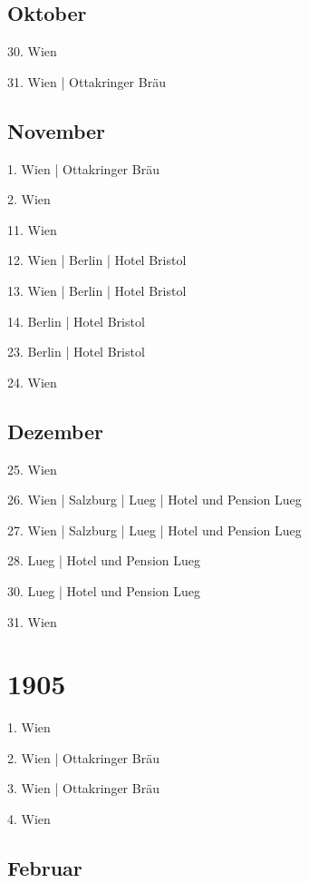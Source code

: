 \documentclass[twoside=false,titlepage=false,open=any, parskip=never, fontsize=10pt, headings=small, chapterprefix=false, appendixprefix=false, DIV=15]{scrbook}
\begin{document}
\begin{multicols}{3}
            \section*{Oktober}
            30. Wien\par
            31. Wien | Ottakringer Bräu\par
            \section*{November}
            1. Wien | Ottakringer Bräu\par
            2. Wien\par
            11. Wien\par
            12. Wien | Berlin | Hotel Bristol\par
            13. Wien | Berlin | Hotel Bristol\par
            14. Berlin | Hotel Bristol\par
            23. Berlin | Hotel Bristol\par
            24. Wien\par
            \section*{Dezember}
            25. Wien\par
            26. Wien | Salzburg | Lueg | Hotel und Pension Lueg\par
            27. Wien | Salzburg | Lueg | Hotel und Pension Lueg\par
            28. Lueg | Hotel und Pension Lueg\par
            30. Lueg | Hotel und Pension Lueg\par
            31. Wien\par
            \chapter*{1905}
            1. Wien\par
            2. Wien | Ottakringer Bräu\par
            3. Wien | Ottakringer Bräu\par
            4. Wien\par
            \section*{Februar}

\end{multicols}
\end{document}
